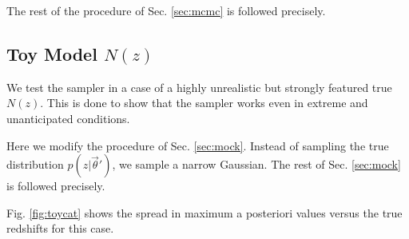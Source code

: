 \documentclass[preprint]{aastex}
\begin{document}
The rest of the procedure of Sec. \ref{sec:mcmc} is followed precisely.

%
%
%

\clearpage
\subsection{Toy Model $N(z)$}
\label{sec:fake}

We test the sampler in a case of a highly unrealistic but strongly featured true $N(z)$.  This is done to show that the sampler works even in extreme and unanticipated conditions.

Here we modify the procedure of Sec. \ref{sec:mock}.  Instead of sampling the true distribution $p(z|\vec{\theta}')$, we sample a narrow Gaussian.  The rest of Sec. \ref{sec:mock} is followed precisely.

Fig. \ref{fig:toycat} shows the spread in maximum a posteriori values versus the true redshifts for this case.
\end{document}
